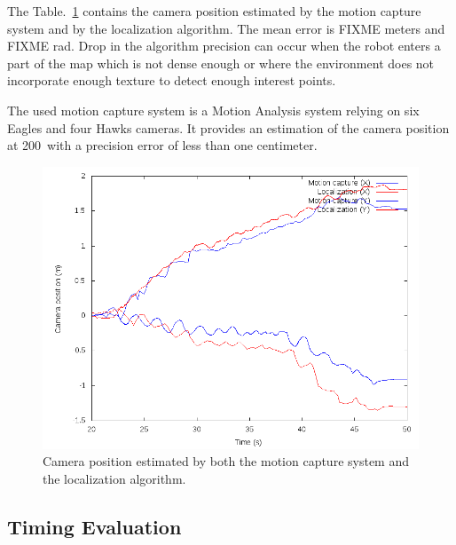 The Table.~\ref{tab:mocap_comparison} contains the camera position
estimated by the motion capture system and by the localization
algorithm. The mean error is FIXME meters and FIXME rad. Drop in the
algorithm precision can occur when the robot enters a part of the map
which is not dense enough or where the environment does not
incorporate enough texture to detect enough interest points.


The used motion capture system is a Motion Analysis system relying on
six Eagles and four Hawks cameras. It provides an estimation of the
camera position at 200\hertz~with a precision error of less than one
centimeter.


\begin{figure}[ht!]
  \begin{center}
    \includegraphics[width=\linewidth]{data/mocap.png}
  \end{center}
  \caption{Camera position estimated by both the motion capture system
    and the localization algorithm. \label{tab:mocap_comparison}}
\end{figure}

\subsection{Timing Evaluation}\label{sec:timing}
